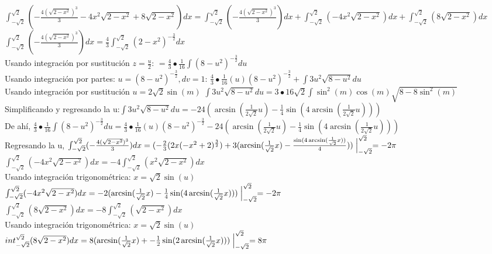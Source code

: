 \documentclass{article}
\begin{document}
\begin{enumerate}
{		$\int_{-\sqrt{2}}^{\sqrt{2}}(-\frac{4(\sqrt{2-x^2})^3}{3} -4x^2\sqrt{2-x^2} + 8\sqrt{2-x^2})dx = \int_{-\sqrt{2}}^{\sqrt{2}}(-\frac{4(\sqrt{2-x^2})^3}{3})dx + \int_{-\sqrt{2}}^{\sqrt{2}}(-4x^2\sqrt{2-x^2})dx+ \int_{-\sqrt{2}}^{\sqrt{2}}(8\sqrt{2-x^2})dx $\\
		
		$\int_{-\sqrt{2}}^{\sqrt{2}}(-\frac{4(\sqrt{2-x^2})^3}{3})dx = \frac{4}{3}\int_{-\sqrt{2}}^{\sqrt{2}}(2-x^2)^{-\frac{3}{2}} dx$\\
		Usando integración por sustitución $z = \frac{u}{2}$:		
		$= \frac{4}{3}\bullet\frac{1}{16}\int(8-u^2)^{-\frac{3}{2}} du $\\
		Usando integración por partes: $u = (8-u^2)^{-\frac{3}{2}} , dv = 1$:
		$\frac{4}{3}\bullet\frac{1}{16}(u)(8-u^2)^{-\frac{3}{2}} + \int3u^2\sqrt{8-u^2}du$\\
		Usando integración por sustitución $u = 2\sqrt{2}\sin(m)$ $\int3u^2\sqrt{8-u^2}du = 3 \bullet 16\sqrt{2} \int \sin^2(m)\cos(m)\sqrt{8-8\sin^2(m)}$\\
		Simplificando y regresando la u:$\int3u^2\sqrt{8-u^2}du = -24(\arcsin(\frac{1}{2\sqrt{2}}u) - \frac{1}{4}\sin(4\arcsin(\frac{1}{2\sqrt{2}}u)))$\\
		De ahí, $\frac{4}{3}\bullet\frac{1}{16}\int(8-u^2)^{-\frac{3}{2}} du = \frac{4}{3}\bullet\frac{1}{16}(u)(8-u^2)^{-\frac{3}{2}} -24(\arcsin(\frac{1}{2\sqrt{2}}u) - \frac{1}{4}\sin(4\arcsin(\frac{1}{2\sqrt{2}}u)))$\\
		Regresando la u, $\int_{-\sqrt{2}}^{\sqrt{2}}(-\frac{4(\sqrt{2-x^2})^3}{3})dx = (-\frac{2}{3}(2x(-x^2 +2)^{\frac{3}{2}}) + 3(\arcsin(\frac{1}{\sqrt{2}}x) - \frac{\sin(4\arcsin(\frac{1}{\sqrt{2}}x))}{4}))\Bigm|_{-\sqrt{2}}^{\sqrt{2}} = -2\pi$\\
		
		$\int_{-\sqrt{2}}^{\sqrt{2}}(-4x^2\sqrt{2-x^2})dx = -4\int_{-\sqrt{2}}^{\sqrt{2}}(x^2\sqrt{2-x^2})dx$\\
		Usando integración trigonométrica: $x = \sqrt{2}\sin(u)$\\
		$\int_{-\sqrt{2}}^{\sqrt{2}}(-4x^2\sqrt{2-x^2})dx = -2(\arcsin(\frac{1}{\sqrt{2}}x) - \frac{1}{4}\sin(4\arcsin(\frac{1}{\sqrt{2}}x)))\Bigm|_{-\sqrt{2}}^{\sqrt{2}} = -2\pi$\\
		
		$\int_{-\sqrt{2}}^{\sqrt{2}}(8\sqrt{2-x^2})dx = -8\int_{-\sqrt{2}}^{\sqrt{2}}(\sqrt{2-x^2})dx$\\
		Usando integración trigonométrica: $x = \sqrt{2}\sin(u)$\\
		$int_{-\sqrt{2}}^{\sqrt{2}}(8\sqrt{2-x^2})dx = 8(\arcsin(\frac{1}{\sqrt{2}}x)+- \frac{1}{2}\sin(2\arcsin(\frac{1}{\sqrt{2}}x)))\Bigm|_{-\sqrt{2}}^{\sqrt{2}} = 8\pi$\\
		
}
\end{enumerate}
\end{document}
